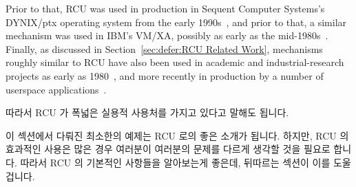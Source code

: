 Prior to that, RCU was used in production in Sequent Computer Systems's
DYNIX/ptx operating system from the early 1990s~\cite{McKenney98},
and prior to that, a similar mechanism was used in IBM's
VM/XA, possibly as early as the mid-1980s~\cite{Hennessy89}.
Finally, as discussed in
Section~\ref{sec:defer:RCU Related Work},
mechanisms roughly similar to RCU have also been used
in academic and industrial-research projects as early as
1980~\cite{Kung80},
and more recently in production by a number of userspace
applications~\cite{MathieuDesnoyers2009URCU,MikeDay2013RCUqemu,GeoffRomer2018C++DeferredReclamationP0561R4}.
\fi

따라서 RCU 가 폭넓은 실용적 사용처를 가지고 있다고 말해도 됩니다.

이 섹션에서 다뤄진 최소한의 예제는 RCU 로의 좋은 소개가 됩니다.
하지만, RCU 의 효과적인 사용은 많은 경우 여러분이 여러분의 문제를 다르게 생각할
것을 필요로 합니다.
따라서 RCU 의 기본적인 사항들을 알아보는게 좋은데, 뒤따르는 섹션이 이를 도울
겁니다.

